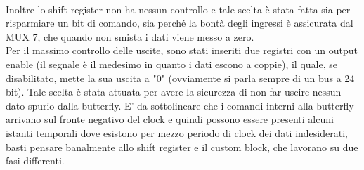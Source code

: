 \documentclass[a4paper, titlepage]{article}
\begin{document}
\\
Inoltre lo shift register non ha nessun controllo e tale scelta è stata fatta sia per risparmiare un bit di comando, sia perché la bontà degli ingressi è assicurata dal MUX 7, che quando non smista i dati viene messo a zero.\\
Per il massimo controllo delle uscite, sono stati inseriti due registri con un output enable (il segnale è il medesimo in quanto i dati escono a coppie), il quale, se disabilitato, mette la sua uscita a "0" (ovviamente si parla sempre di un bus a 24 bit). Tale scelta è stata attuata per avere la sicurezza di non far uscire nessun dato spurio dalla butterfly. E' da sottolineare che i comandi interni alla butterfly arrivano sul fronte negativo del clock e quindi possono essere presenti alcuni istanti temporali dove esistono per mezzo periodo di clock dei dati indesiderati, basti pensare banalmente allo shift register e il custom block, che lavorano su due fasi differenti.
\end{document}
